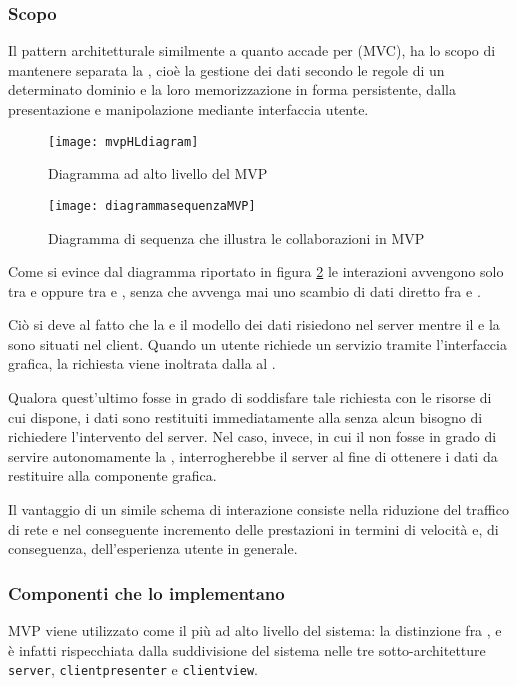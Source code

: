 \subsubsection{Scopo}
Il pattern architetturale  similmente a quanto accade per  (MVC), ha lo scopo di mantenere separata la , cioè la gestione dei dati secondo le regole di un determinato dominio e la loro memorizzazione in forma persistente, dalla presentazione e manipolazione mediante interfaccia utente.


\begin{figure}[H]
  \centering
  \texttt{[image: mvpHLdiagram]}
  \caption{Diagramma ad alto livello del  MVP}\label{fig:mvpHL}
\end{figure}

\begin{figure}[H]
  \centering
  \texttt{[image: diagrammasequenzaMVP]}
  \caption{Diagramma di sequenza che illustra le collaborazioni in MVP}\label{fig:mvpSD}
\end{figure}

Come si evince dal diagramma riportato in figura \ref{fig:mvpSD} le interazioni avvengono solo tra  e  oppure tra  e , senza che avvenga mai uno scambio di dati diretto fra  e .

Ciò si deve al fatto che la  e il modello dei dati risiedono nel server mentre il  e la  sono situati nel client. Quando un utente richiede un servizio tramite l'interfaccia grafica, la richiesta viene inoltrata dalla  al .

Qualora quest'ultimo fosse in grado di soddisfare tale richiesta con le risorse di cui dispone, i dati sono restituiti immediatamente alla  senza alcun bisogno di richiedere l'intervento del server. Nel caso, invece, in cui il  non fosse in grado di servire autonomamente la , interrogherebbe il server al fine di ottenere i dati da restituire alla componente grafica.

Il vantaggio di un simile schema di interazione consiste nella riduzione del traffico di rete e nel conseguente incremento delle prestazioni in termini di velocità e, di conseguenza, dell'esperienza utente in generale.

\subsubsection{Componenti che lo implementano}
MVP viene utilizzato come il  più ad alto livello del sistema: la distinzione fra ,  e  è infatti rispecchiata dalla suddivisione del sistema nelle tre sotto-architetture \texttt{server}, \texttt{clientpresenter} e \texttt{clientview}.

